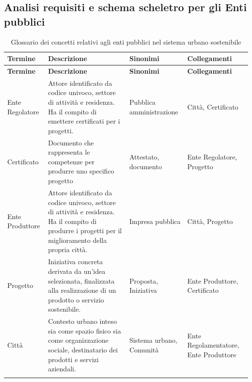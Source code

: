 \documentclass{article}
\begin{document}

\newpage
\subsection{Analisi requisiti e schema scheletro per gli Enti pubblici}

\begin{longtable}{|p{3cm}|p{6.5cm}|p{2.5cm}|p{3cm}|}
\hline
\textbf{Termine} & \textbf{Descrizione} & \textbf{Sinonimi} & \textbf{Collegamenti} \\
\hline
\endfirsthead

\hline
\textbf{Termine} & \textbf{Descrizione} & \textbf{Sinonimi} & \textbf{Collegamenti} \\
\hline
\endhead

Ente Regolatore & Attore identificato da codice univoco, settore di attività e residenza. Ha il compito di emettere certificati per i progetti. & Pubblica amministrazione & Città, Certificato \\
\hline

Certificato & Documento che rappresenta le competenze per produrre uno specifico progetto  & Attestato, documento & Ente Regolatore, Progetto \\
\hline

Ente Produttore & Attore identificato da codice univoco, settore di attività e residenza. Ha il compito di produrre i progetti per il miglioramento della propria città. & Impresa pubblica & Città, Progetto \\
\hline

Progetto & Iniziativa concreta derivata da un’idea selezionata, finalizzata alla realizzazione di un prodotto o servizio sostenibile. & Proposta, Iniziativa & Ente Produttore, Certificato \\
\hline

Città & Contesto urbano inteso sia come spazio fisico sia come organizzazione sociale, destinatario dei prodotti e servizi aziendali. & Sistema urbano, Comunità & Ente Regolamentatore, Ente Produttore \\
\hline

\caption{Glossario dei concetti relativi agli enti pubblici nel sistema urbano sostenibile}
\label{tab:glossario-enti}
\end{longtable}
\end{document}
